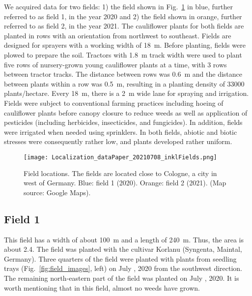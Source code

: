 \documentclass{article}
\def\figref#1{Fig.~\ref{#1}}
\begin{document}
We acquired data for two fields: 1) the field shown in \figref{fig:map} in blue, further referred to as field 1, in the year 2020 and 2) the field shown in orange, further referred to as field 2, in the year 2021. The cauliflower plants for both fields are planted in rows with an orientation from northwest to southeast. 
Fields are designed for sprayers with a working width of \SI{18}{\meter}. Before planting, fields were plowed to prepare the soil. Tractors with \SI{1.8}{\meter} track width were used to plant five rows of nursery-grown young cauliflower plants at a time, with 3 rows between tractor tracks. The distance between rows was \SI{0.6}{\meter} and the distance between plants within a row was \SI{0.5}{\meter}, resulting in a planting density of 33000 plants/hectare. Every \SI{18}{\meter}, there is a \SI{2}{\meter} wide lane for spraying and irrigation. Fields were subject to conventional farming practices including hoeing of cauliflower plants before canopy closure to reduce weeds as well as application of pesticides (including herbicides, insecticides, and fungicides). In addition, fields were irrigated when needed using sprinklers. In both fields, abiotic and biotic stresses were consequently rather low, and plants developed rather uniform.

\begin{figure}[t]
	\centering
    \texttt{[image: Localization\_dataPaper\_20210708\_inklFields.png]}
	\caption{Field locations. The fields are located close to Cologne, a city in west of Germany. Blue: field 1 (2020). Orange: field 2 (2021). (Map source: Google Maps).}
	\label{fig:map}
\end{figure}

\subsection{Field 1}
This field has a width of about \SI{100}{\meter} and a length of \SI{240}{\meter}. Thus, the area is about
\SI{2.4}{\ha}. The field was planted with the cultivar Korlanu (Syngenta, Maintal, Germany). Three quarters of the field were planted with plants from seedling trays (\figref{fig:field_images}, left) on July , 2020 from the southwest direction. The remaining north-eastern part of the field was planted on July , 2020. It is worth mentioning that in this field, almost no weeds have grown.
\end{document}
